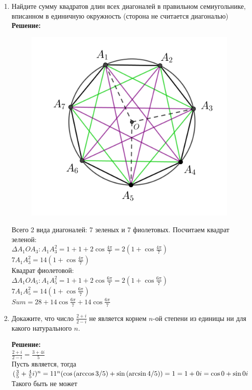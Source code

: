 \documentclass[]{book}
\theoremstyle{definition}
\begin{document}
\begin{enumerate}[resume]
\item Найдите сумму квадратов длин всех диагоналей в правильном семиугольнике, вписанном в единичную окружность (сторона не считается диагональю)\\
\textbf{Решение:}
\\
 \begin{figure}[h!]
\centering
\includegraphics[scale=0.35]{38.PNG}
\end{figure}
Всего 2 вида диагоналей: 7 зеленых и 7 фиолетовых. Посчитаем квадрат зеленой:\\
$\Delta A_1 O A_3: A_1 A_3^2 = 1+1+2\cos{\frac{4\pi}{7}}=2(1+\cos{\frac{4\pi}{7}})$\\
$7A_1 A_3^2 = 14(1+\cos{\frac{4\pi}{7}})$\\
Квадрат фиолетовой:\\
$\Delta A_1 O A_5: A_1 A_5^2 = 1+1+2\cos{\frac{6\pi}{7}}=2(1+\cos{\frac{6\pi}{7}})$\\
$7A_1 A_5^2 = 14(1+\cos{\frac{6\pi}{7}})$\\
$Sum = 28 +14\cos{\frac{6\pi}{7}}+ 14\cos{\frac{6\pi}{7}}  $

\item Докажите, что число $\frac{2+i}{2 - i}$ не является корнем $n$-ой степени из единицы ни для какого натурального $n$.

\textbf{Решение:} \\
$\frac{2 + i}{2 - i} = \frac{3 + 4i}{5}$\\
Пусть является, тогда $(\frac{3}{5} + \frac{4}{5}i)^n = 1 \\
1^n (\cos{(\arccos{3/5})} + \sin{(\arcsin{4/5})}) = 1 = 1 + 0i = \cos{0} + \sin{0} i
$ \\
Такого быть не может


\end{enumerate}
\end{document}
